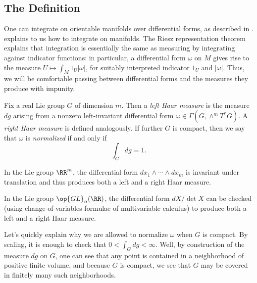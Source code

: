 \documentclass{amsart}
\begin{document}
\subsection{The Definition} \label{subsec:get-haar}
One can integrate on orientable manifolds over differential forms, as described in \cite[Section~16.1]{lee-manifolds}.
 explains to us how to integrate on manifolds.
The Riesz representation theorem explains that integration is essentially the same as measuring by integrating against indicator functions: in particular, a differential form $\omega$ on $M$ gives rise to the measure $U\mapsto\int_M1_U\left|\omega\right|$, for suitably interpreted indicator $1_U$ and $\left|\omega\right|$. Thus, we will be comfortable passing between differential forms and the measures they produce with impunity.
\begin{definition}
	Fix a real Lie group $G$ of dimension $m$. Then a \textit{left Haar measure} is the measure $dg$ arising from a nonzero left-invariant differential form $\omega\in\Gamma(G,\land^mT^*G)$. A \textit{right Haar measure} is defined analogously. If further $G$ is compact, then we say that $\omega$ is \textit{normalized} if and only if
	\[\int_Gdg=1.\]
\end{definition}
\begin{example} \label{ex:haar-rm}
	In the Lie group $\RR^m$, the differential form $dx_1\land\cdots\land dx_m$ is invariant under translation and thus produces both a left and a right Haar measure.
\end{example}
\begin{example} \label{ex:haar-gl}
	In the Lie group $\op{GL}_n(\RR)$, the differential form $dX/\det X$ can be checked (using change-of-variables formulae of multivariable calculus) to produce both a left and a right Haar measure.
\end{example}
\begin{remark}
	Let's quickly explain why we are allowed to normalize $\omega$ when $G$ is compact. By scaling, it is enough to check that $0<\int_Gdg<\infty$. Well, by construction of the measure $dg$ on $G$, one can see that any point is contained in a neighborhood of positive finite volume, and because $G$ is compact, we see that $G$ may be covered in finitely many such neighborhoods.
\end{remark}
\end{document}
